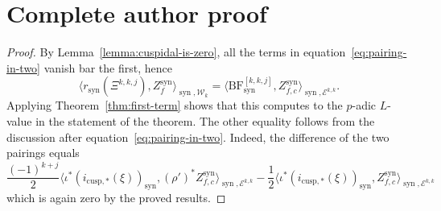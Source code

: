 \documentclass[10pt,a4paper]{amsart}
\newcommand{\BF}{\mathrm{BF}}
\newcommand{\Ell}{\mathcal{E}}
\newcommand{\KS}{\mathscr{W}}
\newcommand{\cBF}{\Xi}
\newcommand{\regulator}[1]{r_{#1}}
\newcommand{\rsyn}{\regulator{\syn}}
\DeclareMathOperator{\syn}{syn}
\begin{document}
\section*{Complete author proof}
\begin{proof}
    By Lemma~\ref{lemma:cuspidal-is-zero}, all the terms in equation~\eqref{eq:pairing-in-two} vanish bar the first, hence
    \[
        \langle \rsyn(\cBF^{k,k,j}),Z_f^{\syn} \rangle_{\syn, \KS_k} = \langle \BF^{[k,k,j]}_{\syn}, Z_{f,c}^{\syn} \rangle_{\syn,\Ell^{k, k}}.
    \]
    Applying Theorem~\ref{thm:first-term} shows that this computes to the $p$-adic $L$-value in the statement of the theorem. The other equality follows from the discussion after equation~\eqref{eq:pairing-in-two}. Indeed, the difference of the two pairings equals
    \[
        \frac{(-1)^{k+j}}{2}\langle \iota^*(i_{\mathrm{cusp},*}(\xi))_{\syn}, (\rho')^* Z_{f,c}^{\syn} \rangle_{\syn,\Ell^{k,k}} - \frac{1}{2}\langle \iota^*(i_{\mathrm{cusp},*}(\xi))_{\syn}, Z_{f,c}^{\syn} \rangle_{\syn,\Ell^{k,k}}
    \]
    which is again zero by the proved results.
\end{proof}
\end{document}
